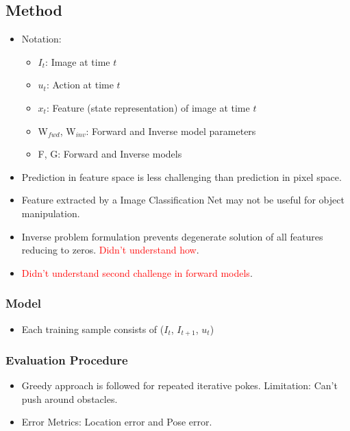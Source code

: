 \documentclass{article}
\begin{document}
    \subsection{Method}\label{subsec:Learning_to_Poke_by_Poking_Experiential_Learning_of_Intuitive_Physics_(NIPS_2016):method}
    \begin{itemize}
        \item Notation:
        \begin{itemize}
            \item $I_t$: Image at time $t$
            \item $u_t$: Action at time $t$
            \item $x_t$: Feature (state representation) of image at time $t$
            \item W$_{fwd}$, W$_{inv}$: Forward and Inverse model parameters
            \item F, G: Forward and Inverse models
        \end{itemize}
        \item Prediction in feature space is less challenging than prediction in pixel space.
        \item Feature extracted by a Image Classification Net may not be useful for object manipulation.
        \item Inverse problem formulation prevents degenerate solution of all features reducing to zeros. \textcolor{red}{Didn't understand how}.
        \item \textcolor{red}{Didn't understand second challenge in forward models}.
    \end{itemize}

    \subsubsection{Model}\label{subsubsec:Learning_to_Poke_by_Poking_Experiential_Learning_of_Intuitive_Physics_(NIPS_2016):model}
    \begin{itemize}
        \item Each training sample consists of ($I_t$, $I_{t+1}$, $u_t$)
    \end{itemize}

    \subsubsection{Evaluation Procedure}\label{subsubsec:Learning_to_Poke_by_Poking_Experiential_Learning_of_Intuitive_Physics_(NIPS_2016):evaluation-procedure}
    \begin{itemize}
        \item Greedy approach is followed for repeated iterative pokes.
        Limitation: Can't push around obstacles.
        \item Error Metrics: Location error and Pose error.
    \end{itemize}
\end{document}
